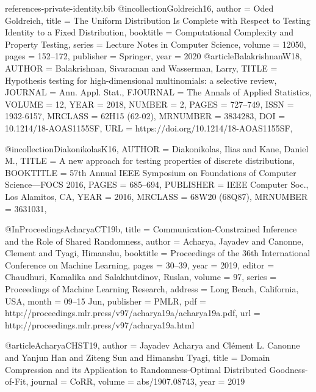 \documentclass[10pt]{article}
\begin{document}
\begin{filecontents}{references-private-identity.bib}
@incollection{Goldreich16,
  author    = {Oded Goldreich},
  title     = {The Uniform Distribution Is Complete with Respect to Testing Identity
               to a Fixed Distribution},
  booktitle = {Computational Complexity and Property Testing},
  series    = {Lecture Notes in Computer Science},
  volume    = {12050},
  pages     = {152--172},
  publisher = {Springer},
  year      = {2020}
}
@article{BalakrishnanW18,
    AUTHOR = {Balakrishnan, Sivaraman and Wasserman, Larry},
     TITLE = {Hypothesis testing for high-dimensional multinomials: a
              selective review},
   JOURNAL = {Ann. Appl. Stat.},
  FJOURNAL = {The Annals of Applied Statistics},
    VOLUME = {12},
      YEAR = {2018},
    NUMBER = {2},
     PAGES = {727--749},
      ISSN = {1932-6157},
   MRCLASS = {62H15 (62-02)},
  MRNUMBER = {3834283},
       DOI = {10.1214/18-AOAS1155SF},
       URL = {https://doi.org/10.1214/18-AOAS1155SF},
}

@incollection{DiakonikolasK16,
    AUTHOR = {Diakonikolas, Ilias and Kane, Daniel M.},
     TITLE = {A new approach for testing properties of discrete
              distributions},
 BOOKTITLE = {57th {A}nnual {IEEE} {S}ymposium on {F}oundations of
              {C}omputer {S}cience---{FOCS} 2016},
     PAGES = {685--694},
 PUBLISHER = {IEEE Computer Soc., Los Alamitos, CA},
      YEAR = {2016},
   MRCLASS = {68W20 (68Q87)},
  MRNUMBER = {3631031},
}

@InProceedings{AcharyaCT19b,
  title = 	 {Communication-Constrained Inference and the Role of Shared Randomness},
  author = 	 {Acharya, Jayadev and Canonne, Clement and Tyagi, Himanshu},
  booktitle = 	 {Proceedings of the 36th International Conference on Machine Learning},
  pages = 	 {30--39},
  year = 	 {2019},
  editor = 	 {Chaudhuri, Kamalika and Salakhutdinov, Ruslan},
  volume = 	 {97},
  series = 	 {Proceedings of Machine Learning Research},
  address = 	 {Long Beach, California, USA},
  month = 	 {09--15 Jun},
  publisher = 	 {PMLR},
  pdf = 	 {http://proceedings.mlr.press/v97/acharya19a/acharya19a.pdf},
  url = 	 {http://proceedings.mlr.press/v97/acharya19a.html}
}

@article{AcharyaCHST19,
  author    = {Jayadev Acharya and
               Cl{\'{e}}ment L. Canonne and
               Yanjun Han and
               Ziteng Sun and
               Himanshu Tyagi},
  title     = {Domain Compression and its Application to Randomness-Optimal Distributed
               Goodness-of-Fit},
  journal   = {CoRR},
  volume    = {abs/1907.08743},
  year      = {2019}
}


\end{filecontents}
\end{document}
